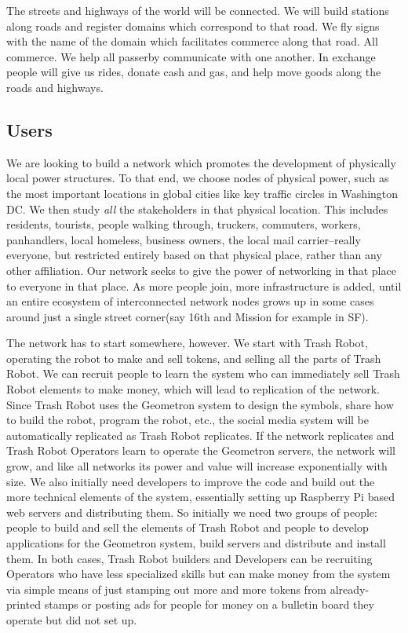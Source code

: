 The streets and highways of the world will be connected.  We will build stations along roads and register domains which correspond to that road.  We fly signs with the name of the domain which facilitates commerce along that road.  All commerce.  We help all passerby communicate with one another. In exchange people will give us rides, donate cash and gas, and help move goods along the roads and highways.  

\subsection{Users}

We are looking to build a network which promotes the development of physically local power structures.  To that end, we choose nodes of physical power, such as the most important locations in global cities like key traffic circles in Washington DC.  We then study \emph{all} the stakeholders in that physical location. This includes residents, tourists, people walking through, truckers, commuters, workers, panhandlers, local homeless, business owners, the local mail carrier--really everyone, but restricted entirely based on that physical place, rather than any other affiliation.  Our network seeks to give the power of networking in that place to everyone in that place. As more people join, more infrastructure is added, until an entire ecosystem of interconnected network nodes grows up in some cases around just a single street corner(say 16th and Mission for example in SF).   

The network has to start somewhere, however.  We start with Trash Robot, operating the robot to make and sell tokens, and selling all the parts of Trash Robot.  We can recruit people to learn the system who can immediately sell Trash Robot elements to make money, which will lead to replication of the network.  Since Trash Robot uses the Geometron system to design the symbols, share how to build the robot, program the robot, etc., the social media system will be automatically replicated as Trash Robot replicates.  If the network replicates and Trash Robot Operators learn to operate the Geometron servers, the network will grow, and like all networks its power and value will increase exponentially with size.  We also initially need developers to improve the code and build out the more technical elements of the system, essentially setting up Raspberry Pi based web servers and distributing them.  So initially we need two groups of people: people to build and sell the elements of Trash Robot and people to develop applications for the Geometron system, build servers and distribute and install them.  In both cases, Trash Robot builders and Developers can be recruiting Operators who have less specialized skills but can make money from the system via simple means of just stamping out more and more tokens from already-printed stamps or posting ads for people for money on a bulletin board they operate but did not set up.


